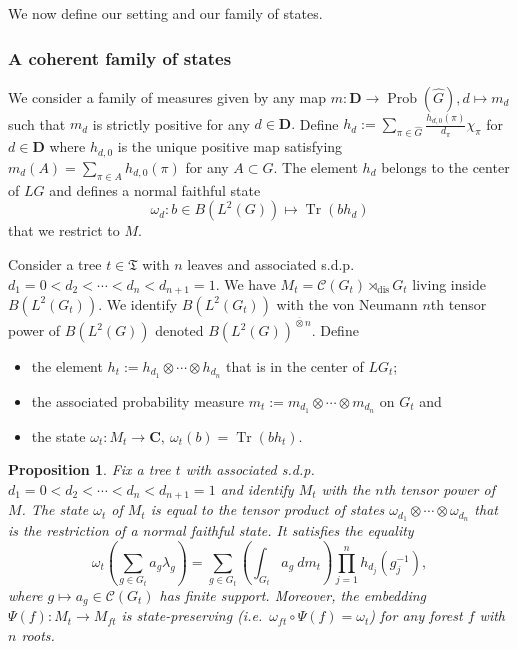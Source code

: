 \documentclass[a4paper,12pt]{amsart}
\numberwithin{equation}{section}
\newtheorem{proposition}[theo]{Proposition}
\theoremstyle{definition}
\newcommand{\scrC}{\mathscr C}
\newcommand{\C}{\mathbf C}
\newcommand{\D}{\mathbf D}
\DeclareMathOperator{\dis}{dis}
\newcommand{\la}{\lambda}
\newcommand{\ot}{\otimes}\newcommand{\otmin}{\otimes_{\text{min}}}
\newcommand{\ovt}{\overline\otimes}
\DeclareMathOperator{\Prob}{Prob}
\newcommand{\fT}{\mathfrak T}
\DeclareMathOperator{\Tr}{Tr}
\newcommand{\wh}{\widehat}
\begin{document}
We now define our setting and our family of states.
\subsubsection{A coherent family of states}
We consider a family of measures given by any map $m:\D\to\Prob(\wh G), d\mapsto m_d$ such that $m_d$ is strictly positive for any $d\in\D.$
Define $h_d:=\sum_{\pi\in\wh G} \tfrac{h_{d,0}(\pi)}{d_\pi} \chi_\pi$ for $d\in\D$ where $h_{d,0}$ is the unique positive map satisfying $m_d(A) = \sum_{\pi\in A} h_{d,0}(\pi)$ for any $A\subset\wh G.$
The element $h_d$ belongs to the center of $LG$ and defines a normal faithful state 
$$\omega_d:b\in B(L^2(G))\mapsto \Tr(b h_d)$$
that we restrict to $M$.

Consider a tree $t\in\fT$ with $n$ leaves and associated s.d.p.~$d_1=0<d_2<\cdots<d_n<d_{n+1}=1.$
We have $M_t=\scrC(G_t) \rtimes_{\dis} G_t $ living inside $B(L^2(G_t))$.
We identify $B(L^2(G_t))$ with the von Neumann $n$th tensor power of $B(L^2(G))$ denoted $B(L^2(G))^{\ovt n}.$
Define 
\begin{itemize}
\item the element $h_t:=h_{d_1}\ot\cdots\ot h_{d_n}$ that is in the center of $LG_t$;
\item the associated probability measure $m_t:=m_{d_1}\ot\cdots\ot m_{d_n}$ on $G_t$ and 
\item the state $\omega_t:M_t\to \C,\ \omega_t(b) = \Tr(b h_t).$
\end{itemize}

\begin{proposition}\label{prop:NCstate}
Fix a tree $t$ with associated s.d.p.~$d_1=0<d_2<\cdots<d_n<d_{n+1}=1$ and identify $M_t$ with the $n$th tensor power of $M$.
The state $\omega_t$ of $M_t$ is equal to the tensor product of states $\omega_{d_1}\ot\cdots\ot\omega_{d_n}$ that is the restriction of a normal faithful state.
It satisfies the equality
\begin{equation}\label{equa:stateNC}\omega_t\left( \sum_{g\in G_t} a_g \la_g \right) = \sum_{g\in G_t} \left( \int_{G_t} a_g \ d m_t \right) \prod_{j=1}^n h_{d_j}(g_j^{-1}),\end{equation}
where $g\mapsto a_g\in \scrC(G_t)$ has finite support. 
Moreover, the embedding $\Psi(f):M_t\to M_{ft}$ is state-preserving (i.e.~$\omega_{ft} \circ \Psi(f) = \omega_{t}$) for any forest $f$ with $n$ roots.
\end{proposition}
\end{document}
